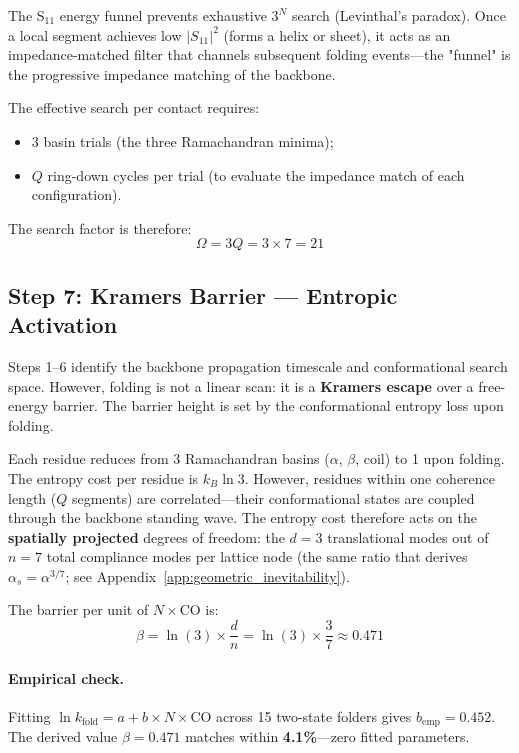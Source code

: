 The S$_{11}$ energy funnel prevents exhaustive $3^N$ search (Levinthal's paradox).
Once a local segment achieves low $|S_{11}|^2$ (forms a helix or sheet), it acts as an impedance-matched filter that channels subsequent folding events---the "funnel" is the progressive impedance matching of the backbone.

The effective search per contact requires:
\begin{itemize}
    \item 3 basin trials (the three Ramachandran minima);
    \item $Q$ ring-down cycles per trial (to evaluate the impedance match of each configuration).
\end{itemize}
The search factor is therefore:
\begin{equation}
    \Omega = 3Q = 3 \times 7 = 21
    \label{eq:omega_search}
\end{equation}

\subsection{Step 7: Kramers Barrier --- Entropic Activation}
\label{sec:kramers_barrier}

Steps 1--6 identify the backbone propagation timescale and conformational search space.
However, folding is not a linear scan: it is a \textbf{Kramers escape} over a free-energy barrier.
The barrier height is set by the conformational entropy loss upon folding.

Each residue reduces from 3 Ramachandran basins ($\alpha$, $\beta$, coil) to 1 upon folding.
The entropy cost per residue is $k_B \ln 3$.
However, residues within one coherence length ($Q$ segments) are correlated---their conformational states are coupled through the backbone standing wave.
The entropy cost therefore acts on the \textbf{spatially projected} degrees of freedom: the $d = 3$ translational modes out of $n = 7$ total compliance modes per lattice node (the same ratio that derives $\alpha_s = \alpha^{3/7}$; see Appendix~\ref{app:geometric_inevitability}).

The barrier per unit of $N \times \text{CO}$ is:
\begin{equation}
    \beta = \ln(3) \times \frac{d}{n} = \ln(3) \times \frac{3}{7} \approx 0.471
    \label{eq:beta_barrier}
\end{equation}

\paragraph{Empirical check.}
Fitting $\ln k_\text{fold} = a + b \times N \times \text{CO}$ across 15 two-state folders gives $b_\text{emp} = 0.452$.
The derived value $\beta = 0.471$ matches within \textbf{4.1\%}---zero fitted parameters.

